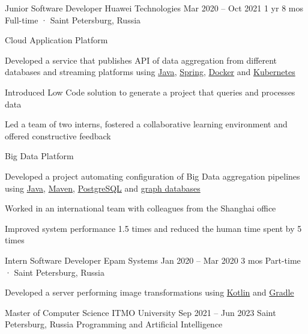 \documentclass[11pt, a4paper]{style}
\begin{document}
\begin{paracol}{2}
    \cvEntry
        {Junior Software Developer} {Huawei Technologies}
        {Mar 2020 -- Oct 2021} {1 yr 8 mos}
        {Full-time · Saint Petersburg, Russia}
        {
            Cloud Application Platform \\
            \vspace{-5mm}
            \begin{cvItems}
                \item Developed a service that publishes API of data aggregation from different databases and streaming platforms using \underline{Java}, \underline{Spring}, \underline{Docker} and \underline{Kubernetes}
                \item Introduced Low Code solution to generate a project that queries and processes data
                \item Led a team of two interns, fostered a collaborative learning environment and offered constructive feedback
            \end{cvItems}
            \vspace{-1mm}
            Big Data Platform \\
            \vspace{-5mm}
            \begin{cvItems}
                \item Developed a project automating configuration of Big Data aggregation pipelines using \underline{Java}, \underline{Maven}, \underline{PostgreSQL} and \underline{graph databases}
                \item Worked in an international team with colleagues from the Shanghai office
                \item Improved system performance 1.5 times and reduced the human time spent by 5 times
            \end{cvItems}
        }

    \cvEntry
        {Intern Software Developer} {Epam Systems}
        {Jan 2020 -- Mar 2020} {3 mos}
        {Part-time · Saint Petersburg, Russia}
        {
            \begin{cvItems}
                \item Developed a server performing image transformations using \underline{Kotlin} and \underline{Gradle}
            \end{cvItems}
        }



    \cvEntry
        {Master of Computer Science} {ITMO University}
        {Sep 2021 -- Jun 2023} {}
        {Saint Petersburg, Russia}
        {
            \vspace{-1mm}
            Programming and Artificial Intelligence
        }


\end{paracol}
\end{document}
